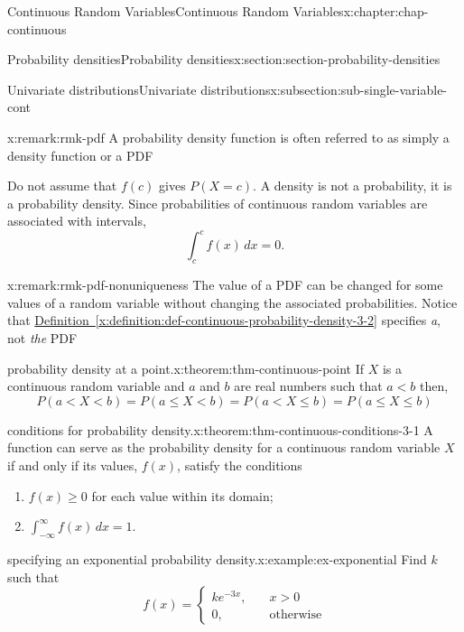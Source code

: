 \documentclass[oneside,10pt,]{book}
\newcommand{\xreffont}{\relax}
\newcommand{\lt}{<}
\newcommand{\gt}{>}
\newcommand{\amp}{&}
\begin{document}
\begin{chapterptx}{Continuous Random Variables}{}{Continuous Random Variables}{}{}{x:chapter:chap-continuous}
\begin{sectionptx}{Probability densities}{}{Probability densities}{}{}{x:section:section-probability-densities}
\begin{subsectionptx}{Univariate distributions}{}{Univariate distributions}{}{}{x:subsection:sub-single-variable-cont}
\begin{remark}{}{x:remark:rmk-pdf}%
A probability density function is often referred to as simply a density function or a PDF%
\end{remark}
Do not assume that \(f(c)\) gives \(P(X = c)\). A density is not a probability, it is a probability density. Since probabilities of continuous random variables are associated with intervals,%
\begin{equation*}
\int_c^c
f(x)\,dx = 0\text{.}
\end{equation*}
%
\begin{remark}{}{x:remark:rmk-pdf-nonuniqueness}%
The value of a PDF can be changed for some values of a random variable without changing the associated probabilities.  Notice that \hyperref[x:definition:def-continuous-probability-density-3-2]{Definition~{\xreffont\ref{x:definition:def-continuous-probability-density-3-2}}} specifies \emph{a}, not \emph{the} PDF%
\end{remark}
\begin{theorem}{probability density at a point.}{}{x:theorem:thm-continuous-point}%
If \(X\) is a continuous random variable and \(a\) and \(b\) are real numbers such that \(a \lt b\) then,%
\begin{equation*}
P(a \lt X \lt b) = P(a \le X \lt b) = P(a \lt X \le b) = P(a \le X
\le b)
\end{equation*}
%
\end{theorem}
\begin{theorem}{conditions for probability density.}{}{x:theorem:thm-continuous-conditions-3-1}%
A function can serve as the probability density for a continuous random variable \(X\) if and only if its values, \(f(x)\), satisfy the conditions%
\begin{enumerate}
\item{}\(f(x) \ge 0\) for each value within its domain;%
\item{}\(\int_{-\infty}^\infty f(x)\,dx = 1\).%
\end{enumerate}
%
\end{theorem}
\begin{example}{specifying an exponential probability density.}{x:example:ex-exponential}%
Find \(k\) such that%
\begin{equation*}
f(x) = \begin{cases}ke^{-3x},\amp \quad x \gt 0\\
0, \amp \quad \text{otherwise}\end{cases}
\end{equation*}

\end{example}
\end{subsectionptx}
\end{sectionptx}
\end{chapterptx}
\end{document}
